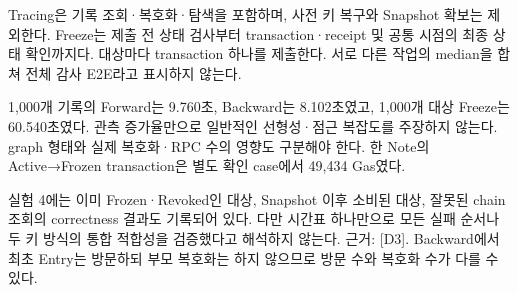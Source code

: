 Tracing은 기록 조회·복호화·탐색을 포함하며, 사전 키 복구와 Snapshot 확보는 제외한다.
Freeze는 제출 전 상태 검사부터 transaction·receipt 및 공통 시점의 최종 상태 확인까지다.
대상마다 transaction 하나를 제출한다. 서로 다른 작업의 median을 합쳐 전체 감사 E2E라고 표시하지 않는다.

1,000개 기록의 Forward는 9.760초, Backward는 8.102초였고, 1,000개 대상 Freeze는 60.540초였다.
관측 증가율만으로 일반적인 선형성·점근 복잡도를 주장하지 않는다. graph 형태와 실제 복호화·RPC 수의 영향도 구분해야 한다.
한 Note의 Active→Frozen transaction은 별도 확인 case에서 49,434 Gas였다.

실험 4에는 이미 Frozen·Revoked인 대상, Snapshot 이후 소비된 대상, 잘못된 chain 조회의 correctness 결과도 기록되어 있다.
다만 시간표 하나만으로 모든 실패 순서나 두 키 방식의 통합 적합성을 검증했다고 해석하지 않는다.
    {\small 근거: [D3]. Backward에서 최초 Entry는 방문하되 부모 복호화는 하지 않으므로 방문 수와 복호화 수가 다를 수 있다.}\par

